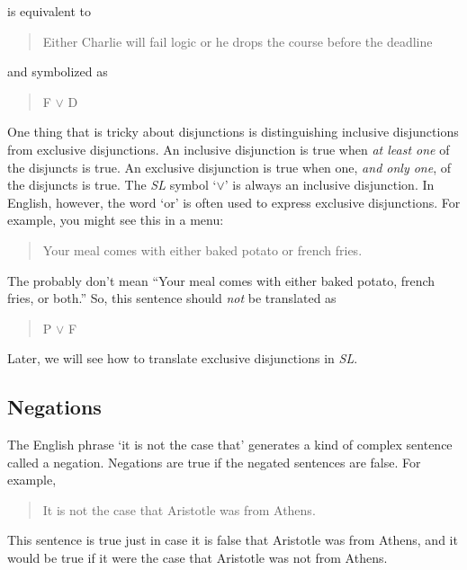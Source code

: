 \documentclass[../logic-text.tex]{subfiles}
\begin{document}
\noindent is equivalent to

\begin{quote}
  Either Charlie will fail logic or he drops the course before the deadline
\end{quote}

\noindent and symbolized as

\begin{quote}
  F \(\lor\) D
\end{quote}

One thing that is tricky about disjunctions is distinguishing inclusive disjunctions from exclusive disjunctions. An inclusive disjunction is true when \emph{at least one} of the disjuncts is true. An exclusive disjunction is true when one, \emph{and only one}, of the disjuncts is true. The \emph{SL} symbol \enquote*{\(\lor\)} is always an inclusive disjunction. In English, however, the word \enquote*{or} is often used to express exclusive disjunctions. For example, you might see this in a menu:

\begin{quote}
  Your meal comes with either baked potato or french fries.
\end{quote}


The probably don't mean \enquote{Your meal comes with either baked potato, french fries, or both.} So, this sentence should \emph{not} be translated as

\begin{quote}
  P \(\lor\) F
\end{quote}


Later, we will see how to translate exclusive disjunctions in \emph{SL}. 



\subsection{Negations}
\label{sec:negations}

The English phrase \enquote*{it is not the case that} generates a kind of complex sentence called a negation. Negations are true if the negated sentences are false. For example,

\begin{quote}
  It is not the case that Aristotle was from Athens.
\end{quote}

This sentence is true just in case it is false that Aristotle was from Athens, and it would be true if it were the case that Aristotle was not from Athens.
\end{document}
